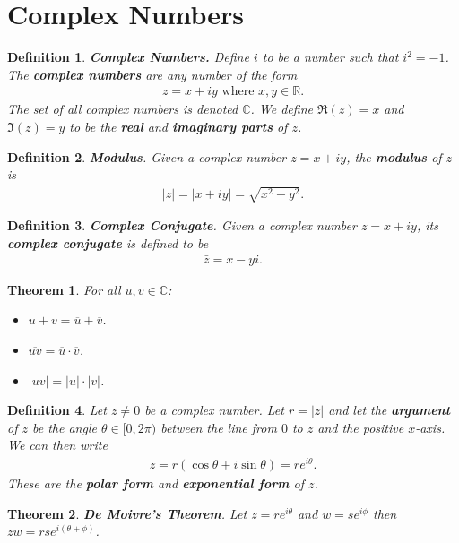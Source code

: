 \documentclass{article}
\theoremstyle{sltheorem}
\newtheorem{definition}{Definition}[section]
\newtheorem{theorem}{Theorem}[section]
\newcommand{\R}{\mathbb{R}}
\renewcommand{\C}{\mathbb{C}}
\newcommand*\lneg[1]{\overline{#1}}
\newcommand*\B[1]{\textbf{#1}}
\begin{document}
\section{Complex Numbers}
\begin{definition}
    \B{Complex Numbers.} Define $i$ to be a number such that $i^2 = -1$. 
    The \B{complex numbers} are any number of the form
    \begin{align*}
        z = x+iy \text{ where } x,y\in\R.
    \end{align*}
    The set of all complex numbers is denoted $\mathbb{C}$. We define $\Re(z) = x$ and $\Im(z)=y$ to be the \B{real} and \B{imaginary parts} of $z$.
\end{definition}
\begin{definition}
    \B{Modulus}. Given a complex number $z=x+iy$, the \B{modulus} of $z$ is
    \begin{align*}
        |z|=|x+iy|=\sqrt{x^2+y^2}.
    \end{align*}
\end{definition}
\begin{definition}
    \B{Complex Conjugate}. Given a complex number $z=x+iy$, its \B{complex conjugate} is defined to be
    \begin{align*}
        \bar{z}=x-yi.
    \end{align*}
\end{definition}
\begin{theorem}
    For all $u,v\in\C$:
    \begin{itemize}
        \item $\lneg{u+v}=\lneg{u}+\lneg{v}$.
        \item $\lneg{uv}=\lneg{u}\cdot\lneg{v}$.
        \item $|uv|=|u|\cdot|v|$.
    \end{itemize}
\end{theorem}
\begin{definition}
    Let $z\not=0$ be a complex number. 
    Let $r=|z|$ and let the \B{argument} of $z$ be the angle $\theta\in[0,2\pi)$ between the line from $0$ to $z$ and the positive $x$-axis. We can then write
    \begin{align*}
        z = r(\cos\theta+i\sin\theta)=re^{i\theta}.
    \end{align*}
    These are the \B{polar form} and \B{exponential form} of $z$.
\end{definition}
\begin{theorem}
    \B{De Moivre's Theorem}. Let $z=re^{i\theta}$ and $w=se^{i\phi}$ then $zw=rse^{i(\theta+\phi)}$.
\end{theorem}
\end{document}

